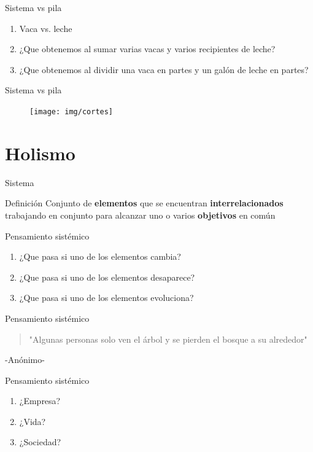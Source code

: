 \documentclass{beamer}
\begin{document}
\begin{frame}{Sistema vs pila}
	\begin{enumerate}
		\item Vaca vs. leche
		\item ¿Que obtenemos al sumar varias vacas y varios recipientes de leche?
		\item ¿Que obtenemos al dividir una vaca en partes y un galón de leche en partes?
	\end{enumerate}
\end{frame}

\begin{frame}{Sistema vs pila}
	\begin{figure}
		\centering
		\texttt{[image: img/cortes]}	
	\end{figure}
\end{frame}

\section{Holismo}
\begin{frame}{Sistema}
	\begin{block}{Definición}
	Conjunto de \textbf{elementos} que se encuentran \textbf{interrelacionados} trabajando en conjunto para alcanzar uno o varios \textbf{objetivos} en común
	\end{block}
\end{frame}

\begin{frame}{Pensamiento sistémico}
	\begin{enumerate}
		\item ¿Que pasa si uno de los elementos cambia?
		\item ¿Que pasa si uno de los elementos desaparece?
		\item ¿Que pasa si uno de los elementos evoluciona?
	\end{enumerate}
\end{frame}

\begin{frame}{Pensamiento sistémico}
	\begin{quote}
"Algunas personas solo ven el árbol y se pierden el bosque a su alrededor"
	\end{quote}

-Anónimo-
\end{frame}


\begin{frame}{Pensamiento sistémico}
	\begin{enumerate}
		\item ¿Empresa?
		\item ¿Vida?
		\item ¿Sociedad?
	\end{enumerate}
\end{frame}
\end{document}
